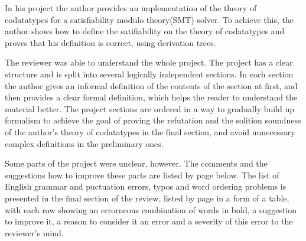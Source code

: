 

\maketitle
In his project the author provides an implementation of the theory of codatatypes for a satisfiability modulo theory(SMT) solver. To achieve this, the author shows how to define the satifiability on the theory of codatatypes and proves that his definition is correct, using derivation trees.


The reviewer was able to understand the whole project. The project has a clear structure and is split into several logically independent sections. In each section the author gives an informal definition of the contents of the section at first, and then provides a clear formal definition, which helps the reader to understand the material better. The project sections are ordered in a way to gradually build up formalism to achieve the goal of proving the refutation and the solition soundness of the author's theory of codatatypes in the final section, and avoid unnecessary complex definitions in the preliminary ones.


Some parts of the project were unclear, however. The comments and the suggestions how to improve these parts are listed by page below. The list of English grammar and puctuation errors, typos and word ordering problems is presented in the final section of the review, listed by page in a form of a table, with each row showing an errorneous combination of words in bold, a suggestion to improve it, a reason to consider it an error and a severity of this error to the reviewer's mind.


